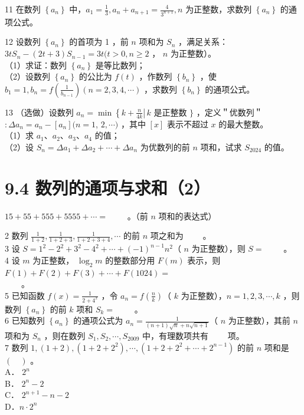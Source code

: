 \documentclass[10pt]{article}
\begin{document}
11 在数列 \(\left\{a_{n}\right\}\) 中，\(a_{1}=\frac{1}{3}, a_{n}+a_{n+1}=\frac{4}{3^{n+1}}, n\) 为正整数，求数列 \(\left\{a_{n}\right\}\) 的通项公式。

12 设数列 \(\left\{a_{n}\right\}\) 的首项为 1 ，前 \(n\) 项和为 \(S_{n}\) ，满足关系： \(3 t S_{n}-(2 t+3) S_{n-1}=3 t(t>0, n \geqslant 2\) ， \(n\) 为正整数）。\\
（1）求证：数列 \(\left\{a_{n}\right\}\) 是等比数列；\\
（2）设数列 \(\left\{a_{n}\right\}\) 的公比为 \(f(t)\) ，作数列 \(\left\{b_{n}\right\}\) ，使 \(b_{1}=1, b_{n}=f\left(\frac{1}{b_{n-1}}\right)(n=2,3,4, \cdots)\) ，求数列 \(\left\{b_{n}\right\}\) 的通项公式。

13 （选做）设数列 \(a_{n}=\min \left\{\left.k+\frac{n}{4 k} \right\rvert\, k\right.\) 是正整数 \(\}\) ，定义＂优数列＂\(: \Delta a_{n}=a_{n}-\left[a_{n}\right](n=1\), \(2, \cdots)\) ，其中 \([x]\) 表示不超过 \(x\) 的最大整数。\\
（1）求 \(a_{1} 、 a_{2} 、 a_{3} 、 a_{4}\) 的值；\\
（2）设 \(S_{n}=\Delta a_{1}+\Delta a_{2}+\cdots+\Delta a_{n}\) 为优数列的前 \(n\) 项和，试求 \(S_{2024}\) 的值。

\section*{9.4 数列的通项与求和（2）}
\(15+55+555+5555+\cdots=\) \(\qquad\)。（前 \(n\) 项和的表达式）

2 数列 \(\frac{1}{1+2}, \frac{1}{1+2+3}, \frac{1}{1+2+3+4}, \cdots\) 的前 \(n\) 项之和为 \(\qquad\)。\\
3 设 \(S=1^{2}-2^{2}+3^{2}-4^{2}+\cdots+(-1)^{n-1} n^{2}\)（ \(n\) 为正整数），则 \(S=\) \(\qquad\)。\\
4 设 \(m\) 为正整数， \(\log _{2} m\) 的整数部分用 \(F(m)\) 表示，则 \(F(1)+F(2)+F(3)+\cdots+F(1024)=\)\\
\(\qquad\)。\\
5 已知函数 \(f(x)=\frac{1}{2+4^{x}}\) ，令 \(a_{n}=f\left(\frac{n}{k}\right)\)（ \(k\) 为正整数），\(n=1,2,3, \cdots, k\) ，则数列 \(\left\{a_{n}\right\}\) 的前 \(k\) 项和 \(S_{k}=\) \(\qquad\)。\\
6 已知数列 \(\left\{a_{n}\right\}\) 的通项公式为 \(a_{n}=\frac{1}{(n+1) \sqrt{n}+n \sqrt{n+1}}\)（ \(n\) 为正整数），其前 \(n\) 项和为 \(S_{n}\) ，则在数列 \(S_{1}, S_{2}, \cdots, S_{2009}\) 中，有理数项共有 \(\qquad\)项。\\
7 数列 \(1,(1+2),\left(1+2+2^{2}\right), \cdots,\left(1+2+2^{2}+\cdots+2^{n-1}\right)\) 的前 \(n\) 项和是 \((\quad)\) 。\\
A． \(2^{n}\)\\
B． \(2^{n}-2\)\\
C． \(2^{n+1}-n-2\)\\
D．\(n \cdot 2^{n}\)
\end{document}
